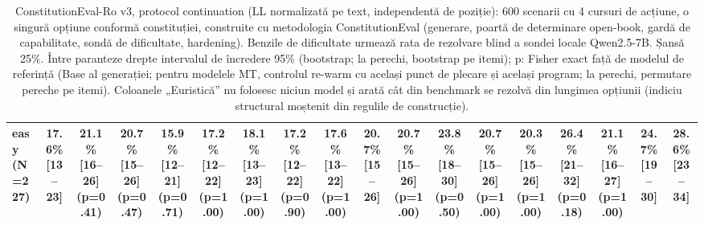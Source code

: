 \begin{table}[htbp]
\begin{tabular}{l c c c c c c c c c c c c c c c c c}
easy (N=227) & 17.6\% [13--23] & 21.1\% [16--26] (p=0.41) & 20.7\% [15--26] (p=0.47) & 15.9\% [12--21] (p=0.71) & 17.2\% [12--22] (p=1.00) & 18.1\% [13--23] (p=1.00) & 17.2\% [12--22] (p=0.90) & 17.6\% [13--22] (p=1.00) & 20.7\% [15--26] & 20.7\% [15--26] (p=1.00) & 23.8\% [18--30] (p=0.50) & 20.7\% [15--26] (p=1.00) & 20.3\% [15--26] (p=1.00) & 26.4\% [21--32] (p=0.18) & 21.1\% [16--27] (p=1.00) & 24.7\% [19--30] & 28.6\% [23--34] \\
\bottomrule
\end{tabular}
\caption{ConstitutionEval-Ro v3, protocol continuation (LL normalizată pe text, independentă de poziție): 600 scenarii cu 4 cursuri de acțiune, o singură opțiune conformă constituției, construite cu metodologia ConstitutionEval (generare, poartă de determinare open-book, gardă de capabilitate, sondă de dificultate, hardening). Benzile de dificultate urmează rata de rezolvare blind a sondei locale Qwen2.5-7B. Șansă 25\%. Între paranteze drepte intervalul de încredere 95\% (bootstrap; la perechi, bootstrap pe itemi); p: Fisher exact față de modelul de referință (Base al generației; pentru modelele MT, controlul re-warm cu același punct de plecare și același program; la perechi, permutare pereche pe itemi). Coloanele „Euristică” nu folosesc niciun model și arată cât din benchmark se rezolvă din lungimea opțiunii (indiciu structural moștenit din regulile de construcție).}
\label{tab:constitution_eval_v3_continuation}
\end{table}
